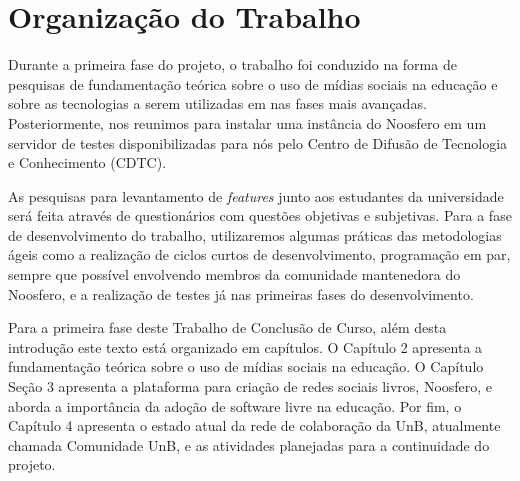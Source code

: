 
\section{Organização do Trabalho}

Durante a primeira fase do projeto, o trabalho foi conduzido na forma de
pesquisas de fundamentação teórica sobre o uso de mídias sociais na educação
e sobre as tecnologias a serem utilizadas em nas fases mais avançadas.
Posteriormente, nos reunimos para instalar uma instância do Noosfero em um
servidor de testes disponibilizadas para nós pelo Centro de Difusão de
Tecnologia e Conhecimento (CDTC). 

As pesquisas para levantamento de \textit{features} junto aos estudantes
da universidade será feita através de questionários com questões objetivas
e subjetivas.
%
Para a fase de desenvolvimento do trabalho, utilizaremos algumas práticas das
metodologias ágeis como a realização de ciclos curtos de desenvolvimento,
programação em par, sempre que possível envolvendo membros da comunidade
mantenedora do Noosfero, e a realização de testes já nas primeiras fases do
desenvolvimento.

Para a primeira fase deste Trabalho de Conclusão de Curso, além desta introdução
este texto está organizado em capítulos. O Capítulo 2 apresenta a fundamentação
teórica sobre o uso de mídias sociais na educação. O Capítulo Seção 3 apresenta
a plataforma para criação de redes sociais livros, Noosfero, e aborda a
importância da adoção de software livre na educação. Por fim, o Capítulo 4
apresenta o estado atual da rede de colaboração da UnB, atualmente chamada
Comunidade UnB, e as atividades planejadas para a continuidade do projeto.
